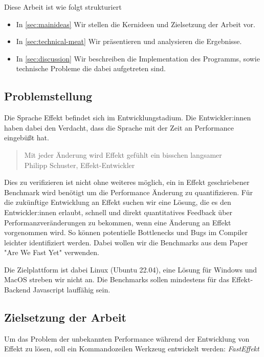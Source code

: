 Diese Arbeit ist wie folgt strukturiert
\begin{itemize}
    \item In \cref{sec:mainideas} Wir stellen die Kernideen und Zielsetzung der Arbeit vor.
    \item In \cref{sec:technical-meat} Wir präsentieren und analysieren die Ergebnisse.
    \item In \cref{sec:discussion} Wir beschreiben die Implementation des Programms, sowie technische Probleme die dabei aufgetreten sind.
\end{itemize}

\subsection{ Problemstellung }
Die Sprache Effekt befindet sich im Entwicklungstadium. Die Entwickler:innen haben dabei den Verdacht, dass die Sprache mit der Zeit an Performance eingebüßt hat.
\begin{center}
    \begin{quote}
        Mit jeder Änderung wird Effekt gefühlt ein bisschen langsamer\\
        Philipp Schuster, Effekt-Entwickler
    \end{quote}
\end{center}
Dies zu verifizieren ist nicht ohne weiteres möglich, ein in Effekt geschriebener Benchmark wird benötigt um die Performance Änderung zu quantifizieren.
Für die zukünftige Entwicklung an Effekt suchen wir eine Lösung, die es den Entwickler:innen erlaubt, schnell und direkt quantitatives Feedback über Performanzveränderungen zu bekommen, wenn eine Änderung an Effekt vorgenommen wird. So können potentielle Bottlenecks und Bugs im Compiler leichter identifiziert werden.
Dabei wollen wir die Benchmarks aus dem Paper "Are We Fast Yet" verwenden.

Die Zielplattform ist dabei Linux (Ubuntu 22.04), eine Lösung für Windows und MacOS streben wir nicht an.
Die Benchmarks sollen mindestens für das Effekt-Backend Javascript lauffähig sein.

\subsection{ Zielsetzung der Arbeit}

Um das Problem der unbekannten Performance während der Entwicklung von Effekt zu lösen, soll ein Kommandozeilen Werkzeug entwickelt werden: \textit{FastEffekt}

